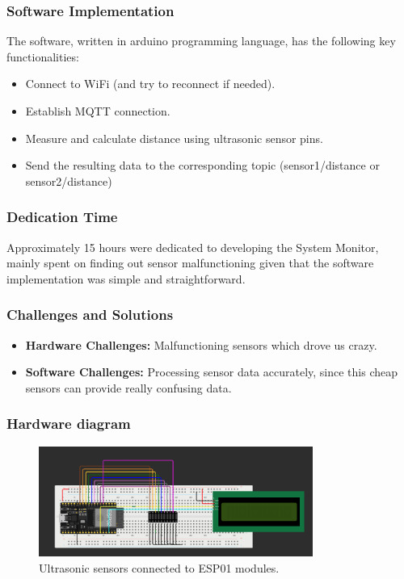 \documentclass{article}
\begin{document}
\subsubsection{Software Implementation}
The software, written in arduino programming language, has the following key functionalities:
\begin{itemize}
    \item Connect to WiFi (and try to reconnect if needed).
    \item Establish MQTT connection.
    \item Measure and calculate distance using ultrasonic sensor pins.
    \item Send the resulting data to the corresponding topic (sensor1/distance or sensor2/distance)
\end{itemize}

\subsubsection{Dedication Time}
Approximately 15 hours were dedicated to developing the System Monitor, mainly spent on finding out sensor malfunctioning given that the software implementation was simple and straightforward.

\subsubsection{Challenges and Solutions}
\begin{itemize}
    \item \textbf{Hardware Challenges:} Malfunctioning sensors which drove us crazy.
    \item \textbf{Software Challenges:} Processing sensor data accurately, since this cheap sensors can provide really confusing data.
\end{itemize}

\subsubsection{Hardware diagram}
\begin{figure}[ht]
    \centering
    \includegraphics[width=0.8\textwidth]{../images/activity_monitor_scheme.png}
    \caption{Ultrasonic sensors connected to ESP01 modules.}
    \label{fig:esp32_system_monitor}
\end{figure}
\end{document}
